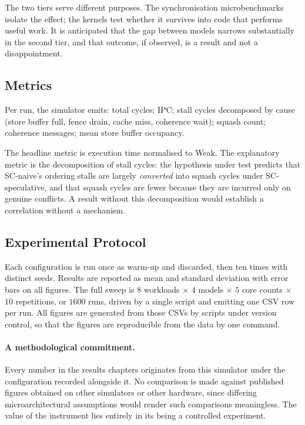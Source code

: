 The two tiers serve different purposes.
The synchronisation microbenchmarks
isolate the effect; the kernels test whether it survives into code that performs
useful work.
It is anticipated that the gap between models narrows substantially
in the second tier, and that outcome, if observed, is a result and not a
disappointment.

\subsection{Metrics}

Per run, the simulator emits: total cycles; IPC; stall cycles decomposed by cause
(store buffer full, fence drain, cache miss, coherence wait); squash count;
coherence messages; mean store buffer occupancy.

The headline metric is execution time normalised to Weak.
The explanatory metric
is the decomposition of stall cycles: the hypothesis under test predicts that
SC-naive's ordering stalls are largely \emph{converted} into squash cycles under
SC-speculative, and that squash cycles are fewer because they are incurred only on
genuine conflicts.
A result without this decomposition would establish a
correlation without a mechanism.

\subsection{Experimental Protocol}

Each configuration is run once as warm-up and discarded, then ten times with
distinct seeds. Results are reported as mean and standard deviation with error
bars on all figures.
The full sweep is $8$ workloads $\times$ $4$ models $\times$
$5$ core counts $\times$ $10$ repetitions, or $1600$ runs, driven by a single
script and emitting one CSV row per run.
All figures are generated from those CSVs
by scripts under version control, so that the figures are reproducible from the
data by one command.

\paragraph{A methodological commitment.} Every number in the results chapters
originates from this simulator under the configuration recorded alongside it.
No
comparison is made against published figures obtained on other simulators or other
hardware, since differing microarchitectural assumptions would render such
comparisons meaningless.
The value of the instrument lies entirely in its being a
controlled experiment.

